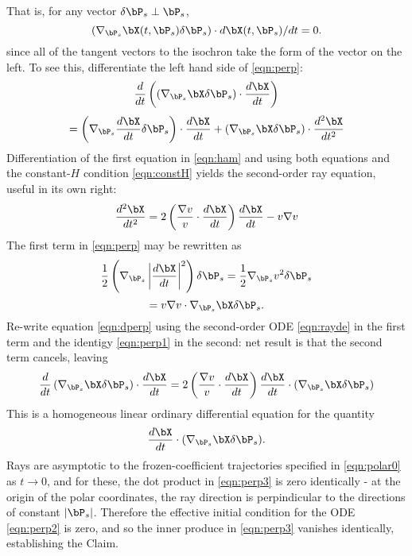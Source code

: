 That is, for any vector $\delta \bP_s \perp \bP_s$, 
\begin{equation}
\label{eqn:perp}
(\nabla_{\bP_s} \bX(t,\bP_s) \delta \bP_s) \cdot d\bX(t,\bP_s)/dt = 0.
\end{equation}
since all of the tangent vectors to the isochron take the form of the
vector on the left. To see this, differentiate the left hand side of
\ref{eqn:perp}:
\[
\frac{d}{dt} \left((\nabla_{\bP_s}\bX \delta \bP_s) \cdot \frac{d\bX}{dt}\right) 
\]
\begin{equation}
\label{eqn:dperp}
= \left(\nabla_{\bP_s}\frac{d \bX}{dt} \delta \bP_s\right) \cdot \frac{d \bX}{dt}  + (\nabla_{\bP_s}\bX \delta \bP_s) \cdot \frac{d^2\bX}{dt^2}
\end{equation}
Differentiation of the first equation in \ref{eqn:ham} and using both
equations and the constant-$H$ condition \ref{eqn:constH} yields the
second-order ray equation, useful in its own right:
\begin{equation}
\label{eqn:rayde}
\frac{d^2\bX}{dt^2} = 2 \left(\frac{\nabla v}{v} \cdot
  \frac{d\bX}{dt}\right)\frac{d\bX}{dt} - v \nabla v
\end{equation}
The first term in \ref{eqn:perp} may be rewritten as 
\[
\frac{1}{2}\left(\nabla_{\bP_s} \left|\frac{d \bX}{dt}\right|^2\right)\delta \bP_s =
\frac{1}{2}\nabla_{\bP_s}v^2 \delta \bP_s
\]
\begin{equation}
\label{eqn:perp1}
=v \nabla v \cdot \nabla_{\bP_s}\bX \delta \bP_s.
\end{equation}
Re-write equation \ref{eqn:dperp} using the second-order ODE
\ref{eqn:rayde} in the first term and the identigy \ref{eqn:perp1} in
the second: net result is that the second term cancels, leaving
\begin{equation}
\label{eqn:perp2}
\frac{d}{dt} \left(\nabla_{\bP_s}\bX \delta \bP_s\right) \cdot \frac{d\bX}{dt} = 2 \left(\frac{\nabla v}{v} \cdot
  \frac{d\bX}{dt}\right)\frac{d\bX}{dt} \cdot (\nabla_{\bP_s}\bX \delta \bP_s) 
\end{equation}
This is a homogeneous linear ordinary differential equation for the
quantity
\begin{equation}
\label{eqn:perp3}
\frac{d\bX}{dt} \cdot (\nabla_{\bP_s}\bX \delta \bP_s).
\end{equation}
Rays are asymptotic to the frozen-coefficient trajectories specified
in \ref{eqn:polar0} as $t \rightarrow 0$, and for these, the dot
product in \ref{eqn:perp3} is zero identically - at the origin of the polar coordinates, the ray direction is perpindicular to the directions of constant $|\bP_s|$. Therefore the
effective initial condition for the ODE \ref{eqn:perp2} is zero, and
so the inner produce in \ref{eqn:perp3} vanishes identically,
establishing the Claim.


